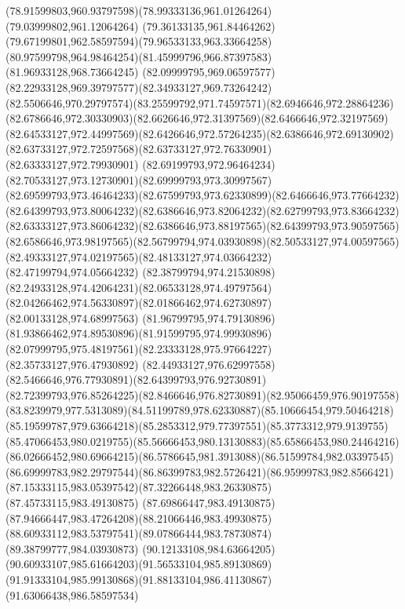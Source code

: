 {{	\curveto(78.91599803,960.93797598)(78.99333136,961.01264264)(79.03999802,961.12064264)
	\curveto(79.36133135,961.84464262)(79.67199801,962.58597594)(79.96533133,963.33664258)
	\curveto(80.97599798,964.98464254)(81.45999796,966.87397583)(81.96933128,968.73664245)
	\curveto(82.09999795,969.06597577)(82.22933128,969.39797577)(82.34933127,969.73264242)
	\curveto(82.5506646,970.29797574)(83.25599792,971.74597571)(82.6946646,972.28864236)
	\curveto(82.6786646,972.30330903)(82.6626646,972.31397569)(82.6466646,972.32197569)
	\curveto(82.64533127,972.44997569)(82.6426646,972.57264235)(82.6386646,972.69130902)
	\curveto(82.63733127,972.72597568)(82.63733127,972.76330901)(82.63333127,972.79930901)
	\curveto(82.69199793,972.96464234)(82.70533127,973.12730901)(82.69999793,973.30997567)
	\curveto(82.69599793,973.46464233)(82.67599793,973.62330899)(82.6466646,973.77664232)
	\curveto(82.64399793,973.80064232)(82.6386646,973.82064232)(82.62799793,973.83664232)
	\curveto(82.63333127,973.86064232)(82.6386646,973.88197565)(82.64399793,973.90597565)
	\curveto(82.6586646,973.98197565)(82.56799794,974.03930898)(82.50533127,974.00597565)
	\curveto(82.49333127,974.02197565)(82.48133127,974.03664232)(82.47199794,974.05664232)
	\curveto(82.38799794,974.21530898)(82.24933128,974.42064231)(82.06533128,974.49797564)
	\curveto(82.04266462,974.56330897)(82.01866462,974.62730897)(82.00133128,974.68997563)
	\curveto(81.96799795,974.79130896)(81.93866462,974.89530896)(81.91599795,974.99930896)
	\curveto(82.07999795,975.48197561)(82.23333128,975.97664227)(82.35733127,976.47930892)
	\curveto(82.44933127,976.62997558)(82.5466646,976.77930891)(82.64399793,976.92730891)
	\curveto(82.72399793,976.85264225)(82.8466646,976.82730891)(82.95066459,976.90197558)
	\curveto(83.8239979,977.5313089)(84.51199789,978.62330887)(85.10666454,979.50464218)
	\curveto(85.19599787,979.63664218)(85.2853312,979.77397551)(85.3773312,979.9139755)
	\curveto(85.47066453,980.0219755)(85.56666453,980.13130883)(85.65866453,980.24464216)
	\curveto(86.02666452,980.69664215)(86.5786645,981.3913088)(86.51599784,982.03397545)
	\curveto(86.69999783,982.29797544)(86.86399783,982.5726421)(86.95999783,982.8566421)
	\curveto(87.15333115,983.05397542)(87.32266448,983.26330875)(87.45733115,983.49130875)
	\curveto(87.69866447,983.49130875)(87.94666447,983.47264208)(88.21066446,983.49930875)
	\curveto(88.60933112,983.53797541)(89.07866444,983.78730874)(89.38799777,984.03930873)
	\curveto(90.12133108,984.63664205)(90.60933107,985.61664203)(91.56533104,985.89130869)
	\curveto(91.91333104,985.99130868)(91.88133104,986.41130867)(91.63066438,986.58597534)
}}
